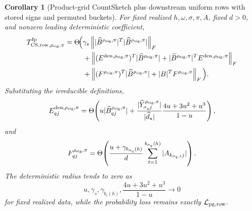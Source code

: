 \documentclass[11pt]{article}
\newcommand{\Frob}[1]{\left\lVert #1\right\rVert_F}
\newtheorem{corollary}[theorem]{Corollary}
\theoremstyle{remark}
\begin{document}
\begin{corollary}[Product-grid CountSketch plus downstream uniform rows with stored signs and permuted buckets]
For fixed realized \(h,\omega,\sigma,\pi,A\), fixed \(d>0\), and nonzero
leading deterministic coefficient,
\[
  \begin{aligned}
  T_{{\rm CS,row},\rho_{\rm sig},\pi}^{\rm fp}
  =
  \Theta\!\Big(
  &\gamma_s
      \Frob{|\widehat B^{\rho_{\rm sig},\pi}|^T
            |\widehat B^{\rho_{\rm sig},\pi}|}
  \\
  &+
    \Frob{(E^{{\rm den},\rho_{\rm sig},\pi})^T
          |\widehat B^{\rho_{\rm sig},\pi}|
          +
          |\widetilde B^{\rho_{\rm sig},\pi}|^T
          E^{{\rm den},\rho_{\rm sig},\pi}}
  \\
  &+
    \Frob{(F^{\rho_{\rm sig},\pi})^T
          |\widetilde B^{\rho_{\rm sig},\pi}|
          +
          |B|^TF^{\rho_{\rm sig},\pi}}
  \Big).
  \end{aligned}
\]
Substituting the irreducible definitions,
\[
  E^{{\rm den},\rho_{\rm sig},\pi}_{qj}
  =
  \Theta\!\left(
    u|\widehat B^{\rho_{\rm sig},\pi}_{qj}|
    +
    \frac{|\widehat Y^{\rho_{\rm sig},\pi}_{\sigma_qj}|}
         {|\widehat d_\star|}
    \frac{4u+3u^2+u^3}{1-u}
  \right),
\]
and
\[
  F^{\rho_{\rm sig},\pi}_{qj}
  =
  \Theta\!\left(
    \frac{u+\gamma_{b_{\sigma_q}(h)}}{d}
    \sum_{t=1}^{b_{\sigma_q}(h)}
      |A_{k_{\sigma_q,t}j}|
  \right).
\]
The deterministic radius tends to zero as
\[
  u,\gamma_s,\gamma_{b_i(h)},\frac{4u+3u^2+u^3}{1-u}\to0
\]
for fixed realized data, while the probability loss remains exactly
\(\mathcal L_{\rm pg,row}\).
\end{corollary}
\end{document}
